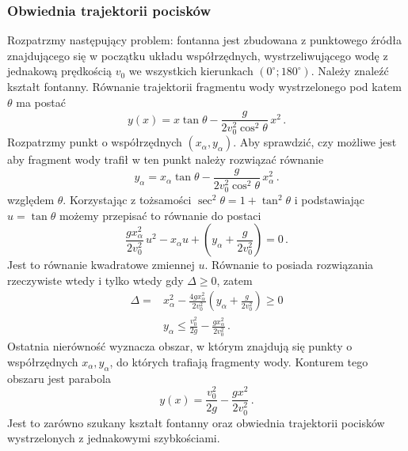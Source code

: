\documentclass[../main.tex]{subfiles}
\begin{document}
\subsubsection*{Obwiednia trajektorii pocisków}
Rozpatrzmy następujący problem: fontanna jest zbudowana z punktowego źródła znajdującego się w
początku układu współrzędnych, wystrzeliwującego wodę z jednakową prędkością \(v_0\) we wszystkich
kierunkach \((0^\circ;180^\circ)\). Należy znaleźć kształt fontanny. Równanie trajektorii fragmentu
wody wystrzelonego pod katem \(\theta\) ma postać
\begin{equation*}
    y(x)=x\tan\theta-\frac{g}{2v_0^2\cos^2\theta}\,x^2\,.
\end{equation*}
Rozpatrzmy punkt o współrzędnych \((x_\alpha,y_\alpha)\). Aby sprawdzić, czy możliwe jest aby
fragment wody trafił w ten punkt należy rozwiązać równanie
\begin{equation*}
    y_\alpha=x_\alpha\tan\theta-\frac{g}{2v_0^2\cos^2\theta}\,x_\alpha^2\,.
\end{equation*}
względem \(\theta\). Korzystając z tożsamości \(\sec^2\theta=1+\tan^2\theta\) i podstawiając
\(u=\tan \theta\) możemy przepisać to równanie do postaci
\begin{equation*}
    \frac{gx_\alpha^2}{2v_0^2}\,u^2-x_\alpha u+\left(y_\alpha+\frac{g}{2v_0^2}\right)=0\,.
\end{equation*}
Jest to równanie kwadratowe zmiennej \(u\). Równanie to posiada rozwiązania rzeczywiste wtedy i
tylko wtedy gdy \(\Delta \geq0\), zatem
\begin{equation*}
    \begin{split}
        \Delta = &x_\alpha^2-\frac{4gx_\alpha^2}{2v_0^2}\left(y_\alpha+\frac{g}{2v_0^2}\right)\geq0\\
        &y_\alpha\leq \frac{v_0^2}{2g}-\frac{gx_\alpha^2}{2v_0^2}\,.
    \end{split}
\end{equation*}
Ostatnia nierówność wyznacza obszar, w którym znajdują się punkty o współrzędnych
\(x_\alpha,y_\alpha\), do których trafiają fragmenty wody. Konturem tego obszaru jest parabola
\begin{equation*}
   y(x)=\frac{v_0^2}{2g}-\frac{gx^2}{2v_0^2}\,.
\end{equation*}
Jest to zarówno szukany kształt fontanny oraz obwiednia trajektorii pocisków wystrzelonych z
jednakowymi szybkościami.
\medskip
\end{document}
